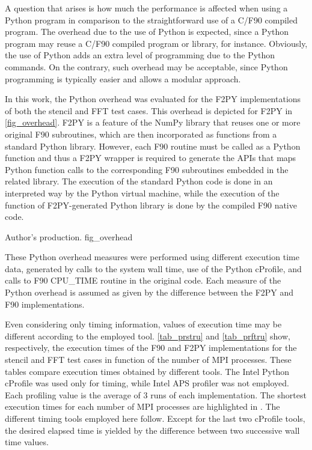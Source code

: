 A question that arises is how much the performance is affected when using a Python program in comparison to the straightforward use of a C/F90 compiled program. The overhead due to the use of Python is expected, since a Python program may reuse a C/F90 compiled program or library, for instance. Obviously, the use of Python adds an extra level of programming due to the Python commands. On the contrary, such overhead may be acceptable, since Python programming is typically easier and allows a modular approach. 

In this work, the Python overhead was evaluated for the F2PY implementations of both the stencil and FFT test cases. This overhead is depicted for F2PY in \autoref {fig_overhead}. F2PY is a feature of the NumPy library that reuses one or more original F90 subroutines, which are then incorporated as functions from a standard Python library. However, each F90 routine must be called as a Python function and thus a F2PY wrapper is required to generate the APIs that maps Python function calls to the corresponding F90 subroutines embedded in the related library. The execution of the standard Python code is done in an interpreted way by the Python virtual machine, while the execution of the function of F2PY-generated Python library is done by the compiled F90 native code.

     {Author's production.} {fig_overhead}

These Python overhead measures were performed using different execution time data, generated by calls to the system wall time, use of the Python cProfile, and calls to F90 CPU\_TIME routine in the original code. Each measure of the Python overhead is assumed as given by the difference between the F2PY and F90 implementations. 

Even considering only timing information, values of execution time may be different according to the employed tool. \autoref {tab_prstru} and \autoref {tab_prftru} show, respectively, the execution times of the F90 and F2PY implementations for the stencil and FFT test cases in function of the number of MPI processes. These tables compare execution times obtained by different tools. The Intel Python cProfile was used only for timing, while Intel APS profiler was not employed. Each profiling value is the average of 3 runs of each implementation. The shortest execution times for each number of MPI processes are highlighted in . The different timing tools employed here follow. Except for the last two cProfile tools, the desired elapsed time is yielded by the difference between two successive wall time values.

